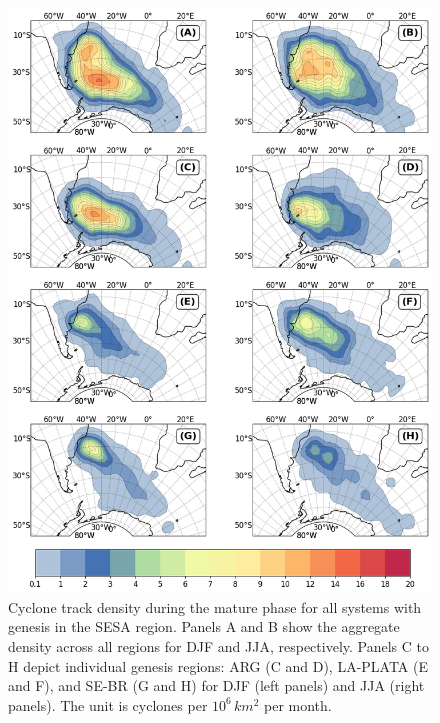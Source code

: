 \begin{figure}[!htbp]
\centering
\includegraphics[width=\textwidth]{figs_4/density_map_mature.png}
\caption[Track Density - Mature Phase]{Cyclone track density during the mature phase for all systems with genesis in the SESA region. Panels A and B show the aggregate density across all regions for DJF and JJA, respectively. Panels C to H depict individual genesis regions: ARG (C and D), LA-PLATA (E and F), and SE-BR (G and H) for DJF (left panels) and JJA (right panels). The unit is cyclones per \(10^6 \, km^2\) per month.}
\label{fig:density_map_mature}
\end{figure}

